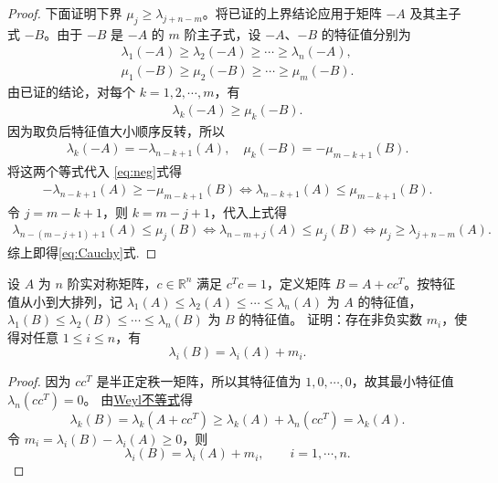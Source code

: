 \documentclass[../../main.tex]{subfiles}%
\begin{document}
\begin{proof}
下面证明下界 $\mu_j \geqslant \lambda_{j+n-m}$。将已证的上界结论应用于矩阵 $-A$ 及其主子式 $-B$。由于 $-B$ 是 $-A$ 的 $m$ 阶主子式，设 $-A$、$-B$ 的特征值分别为
\begin{gather*}
\lambda_1(-A)\geqslant \lambda_2(-A)\geqslant \cdots \geqslant \lambda_n(-A),
\\
\mu_1(-B)\geqslant \mu_2(-B)\geqslant \cdots \geqslant \mu_m(-B).
\end{gather*}
由已证的结论，对每个 $k=1,2,\cdots,m$，有
\begin{align}
\lambda_k(-A) \geqslant \mu_k(-B). \label{eq:neg}
\end{align}
因为取负后特征值大小顺序反转，所以
\begin{gather*}
\lambda_k(-A) = -\lambda_{n-k+1}(A),
\quad
\mu_k(-B) = -\mu_{m-k+1}(B).
\end{gather*}
将这两个等式代入 \eqref{eq:neg}式得
\begin{align*}
-\lambda_{n-k+1}(A) \geqslant -\mu_{m-k+1}(B)\iff \lambda_{n-k+1}(A) \leqslant \mu_{m-k+1}(B).
\end{align*}
令 $j = m-k+1$，则 $k = m-j+1$，代入上式得
\begin{align*}
\lambda_{n-(m-j+1)+1}(A) \leqslant \mu_j(B)
\iff 
\lambda_{n-m+j}(A) \leqslant \mu_j(B)\iff 
\mu_j \geqslant \lambda_{j+n-m}(A).
\end{align*}
综上即得\eqref{eq:Cauchy}式.
\end{proof}

\begin{example}
设 $A$ 为 $n$ 阶实对称矩阵，$c\in\mathbb{R}^n$ 满足 $c^Tc=1$，定义矩阵 $B=A+cc^T$。按特征值从小到大排列，记 $\lambda_1(A)\leqslant \lambda_2(A)\leqslant \cdots \leqslant \lambda_n(A)$ 为 $A$ 的特征值，$\lambda_1(B)\leqslant \lambda_2(B)\leqslant \cdots \leqslant \lambda_n(B)$ 为 $B$ 的特征值。
证明：存在非负实数 $m_i$，使得对任意 $1\leqslant i\leqslant n$，有  
\[\lambda_i(B)=\lambda_i(A)+m_i.\]
\end{example}
\begin{proof}
因为 $cc^T$ 是半正定秩一矩阵，所以其特征值为 $1,0,\cdots,0$，故其最小特征值 $\lambda_n(cc^T)=0$。
由\hyperref[theorem:Weyl不等式]{Weyl不等式}得
\[
\lambda_k(B)=\lambda_k(A+cc^T)\geqslant \lambda_k(A)+\lambda_n(cc^T)=\lambda_k(A).
\]
令 $m_i=\lambda_i(B)-\lambda_i(A)\geqslant 0$，则
\[
\lambda_i(B)=\lambda_i(A)+m_i,\qquad i=1,\cdots,n.
\]\end{proof}
\end{document}
